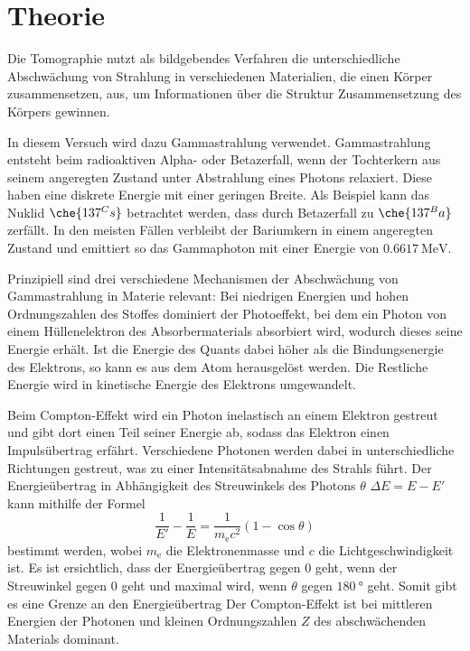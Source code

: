 \section{Theorie}
\label{sec:Theorie}

Die Tomographie nutzt als bildgebendes Verfahren die unterschiedliche Abschwächung von Strahlung in verschiedenen Materialien, die einen Körper zusammensetzen, aus, um Informationen über die Struktur Zusammensetzung des Körpers gewinnen.

In diesem Versuch wird dazu Gammastrahlung verwendet. Gammastrahlung entsteht beim radioaktiven Alpha- oder Betazerfall, wenn der Tochterkern aus seinem angeregten Zustand unter Abstrahlung eines Photons relaxiert. Diese haben eine diskrete Energie mit einer geringen Breite.
Als Beispiel kann das Nuklid $\che{137^Cs}$ betrachtet werden, dass durch Betazerfall zu $\che{137^Ba}$ zerfällt. In den meisten Fällen verbleibt der Bariumkern in einem angeregten Zustand und emittiert so das Gammaphoton mit einer Energie von $\SI{0.6617}{\mega\electronvolt}$.

Prinzipiell sind drei verschiedene Mechanismen der Abschwächung von Gammastrahlung in Materie relevant: Bei niedrigen Energien und hohen Ordnungszahlen des Stoffes dominiert der Photoeffekt, bei dem ein Photon von einem Hüllenelektron des Absorbermaterials
absorbiert wird, wodurch dieses seine Energie erhält. Ist die Energie des Quants dabei höher als die Bindungsenergie des Elektrons, so kann es aus dem Atom herausgelöst werden. Die Restliche Energie wird in kinetische Energie des Elektrons umgewandelt.

Beim Compton-Effekt wird ein Photon inelastisch an einem Elektron gestreut und gibt dort einen Teil seiner Energie ab, sodass das Elektron einen Impulsübertrag erfährt.
Verschiedene Photonen werden dabei in unterschiedliche Richtungen gestreut, was zu einer Intensitätsabnahme
des Strahls führt.
Der Energieübertrag in Abhängigkeit des Streuwinkels des Photons $\theta$ $\Delta E = E - E'$ kann mithilfe der Formel
\begin{equation}
	\frac{1}{E'} - \frac{1}{E} = \frac{1}{m_\text{e} c^2} (1-\cos\theta)
\end{equation}
bestimmt werden, wobei $m_\text{e}$ die Elektronenmasse und $c$ die Lichtgeschwindigkeit ist. Es ist ersichtlich, dass der Energieübertrag gegen 0 geht, wenn der Streuwinkel gegen 0 geht und maximal wird, wenn $\theta$ gegen $\SI{180}{\degree}$ geht. Somit gibt es eine Grenze an den Energieübertrag
Der Compton-Effekt ist bei mittleren Energien der Photonen und kleinen Ordnungszahlen $Z$ des abschwächenden Materials dominant.

